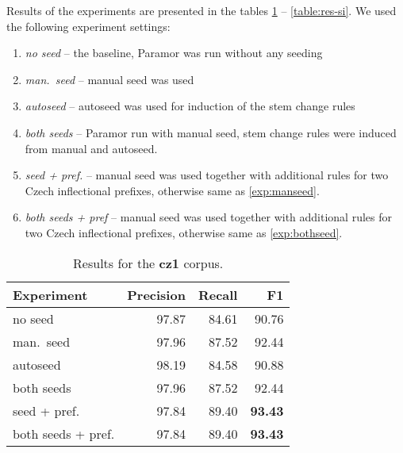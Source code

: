 \documentclass[11pt]{article}
\newcommand{\e}[1]{\textit{#1}} %
\begin{document}
\noindent
Results of the experiments are presented in the tables \ref{table:res-cz1} -- \ref{table:res-si}. We used the following experiment settings:\begin{enumerate}
\item \e{no seed} -- the baseline, Paramor was run without any seeding
\item \label{exp:manseed} \e{man.~seed} -- manual seed was used
\item \e{autoseed} -- autoseed was used for induction of the stem change rules
\item \label{exp:bothseed}
    \e{both seeds} -- Paramor run with manual seed, stem change rules were induced from manual and autoseed.
\item \e{seed + pref.} -- manual seed was used together with additional rules for two Czech inflectional prefixes, otherwise same as \ref{exp:manseed}.
\item \e{both seeds + pref} --  manual seed was used together with additional rules for two Czech inflectional prefixes, otherwise same as \ref{exp:bothseed}.
\end{enumerate}

\begin{table}[h]
\begin{center}
\begin{tabular}{|l|r|r|r|}
\hline \bf Experiment & \bf Precision & \bf Recall & \bf F1\\ \hline
no seed &  97.87 & 84.61 & 90.76 \\
man.~seed & 97.96 &  87.52 & 92.44 \\
autoseed & 98.19 & 84.58 & 90.88\\
both seeds & 97.96 & 87.52 & 92.44\\
seed + pref. & 97.84 & 89.40 & \bf 93.43\\
both seeds + pref.& 97.84 & 89.40 & \bf 93.43 \\
\hline
\end{tabular}
\end{center}
\caption{\label{table:res-cz1} Results for the \textbf{cz1} corpus.}
\end{table}
\end{document}
